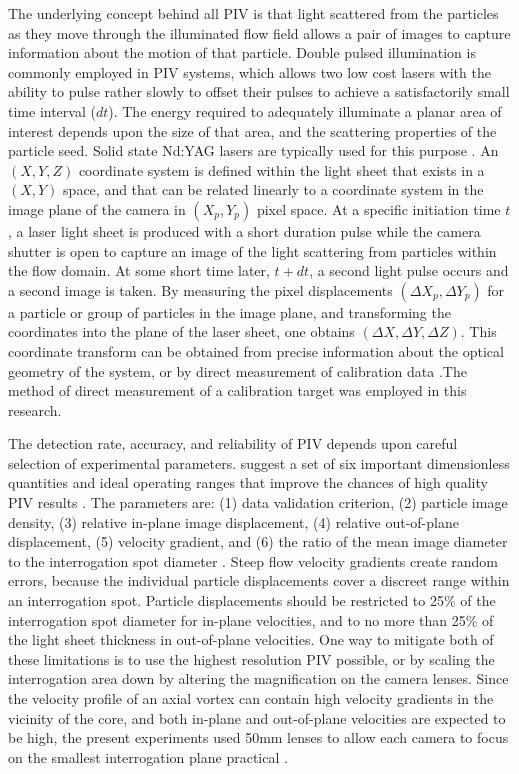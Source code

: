 The 
underlying concept behind all PIV is that light scattered from the particles as 
they move through the illuminated flow field allows a pair of images to capture 
information about the motion of that particle. Double pulsed illumination is 
commonly employed in PIV systems, which allows two low cost lasers with the 
ability to pulse rather slowly to offset their pulses to achieve a 
satisfactorily small time interval ($dt$). The energy required to adequately 
illuminate a planar area of interest depends upon the size of that area, and 
the scattering properties of the particle seed. Solid state Nd:YAG lasers are 
typically used for this purpose \cite{adrian2011}. An $(X, Y, Z)$ coordinate 
system is defined within the light sheet that exists in a $(X, Y)$ 
space, and that can be related linearly to a 
coordinate system in the image plane of the camera in $(X_p, Y_p)$ pixel space. 
At a specific initiation time $t$, a laser light sheet is produced with a short 
duration pulse while the camera shutter is open to 
capture an image of the light scattering from particles within the flow domain. 
At some short time later, $t + dt$, a second light pulse occurs and a second 
image is taken. By measuring the pixel displacements $(\Delta X_p, \Delta 
Y_p)$ for a particle or group of particles in the image plane, and transforming 
the coordinates into the plane of the laser sheet, one obtains $(\Delta X, 
\Delta Y, \Delta Z)$. This coordinate transform can be obtained from precise 
information about the optical geometry of the system, or by direct measurement 
of calibration data \cite{fouras2007}.The method of direct measurement of a 
calibration target was employed in this research. 

The detection rate, accuracy, and reliability of PIV depends upon careful 
selection of experimental parameters. \cite{keane1990} suggest a set of six 
important dimensionless quantities and ideal operating ranges that improve the 
chances of high quality PIV results . The parameters 
are: (1) data validation criterion, (2) particle image density, (3) relative 
in-plane image displacement, (4) relative out-of-plane displacement, (5) 
velocity gradient, and (6) the ratio of the mean image diameter to the 
interrogation spot diameter \cite{keane1990,lawson1997b}. Steep flow velocity 
gradients create random errors, because the 
individual particle displacements cover a discreet range within an 
interrogation spot. Particle displacements should be restricted to 25\% of the 
interrogation spot diameter for in-plane velocities, and to no more than 25\% 
of the light 
sheet thickness in out-of-plane velocities. One way to mitigate both of these 
limitations is to use the highest resolution PIV possible, or by scaling the 
interrogation area down by altering the magnification on the camera lenses. 
Since the velocity profile of an axial vortex can contain high velocity 
gradients in the vicinity of the core, and both in-plane and out-of-plane 
velocities are expected to be high, the present experiments used 50mm lenses to 
allow each camera to focus on the smallest interrogation plane practical
\cite{prasad1992}.

